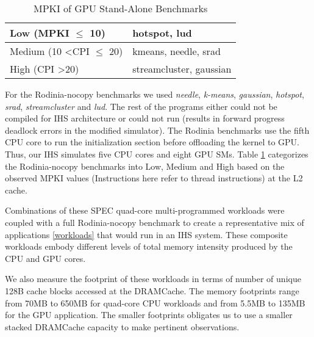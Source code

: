 \begin{table}[htb]
	\centering
	\begin{tabular}{|l|l|}
		\hline
		Low (MPKI $\leq$ 10)                & hotspot, lud           \\ \hline
		Medium (10 \textless CPI $\leq$ 20) &  kmeans, needle, srad   \\ \hline
		High (CPI \textgreater 20)            & streamcluster, gaussian       \\ \hline
	\end{tabular}
	\caption{MPKI of GPU Stand-Alone Benchmarks}
	\label{single-gpu-mpki}
\end{table}

For the Rodinia-nocopy benchmarks we used \textit{needle}, \textit{k-means}, \textit{gaussian}, \textit{hotspot}, \textit{srad}, \textit{streamcluster} and \textit{lud}. The rest of the programs either could not be compiled for IHS architecture or could not run (results in forward progress deadlock errors in the modified simulator). The Rodinia benchmarks use the fifth CPU core to run the initialization section before offloading the kernel to GPU. Thus, our IHS simulates five CPU cores and eight GPU SMs. Table \ref{single-gpu-mpki} categorizes the Rodinia-nocopy benchmarks into Low, Medium and High based on the observed MPKI values (Instructions here refer to thread instructions) at the L2 cache.


\par Combinations of these SPEC quad-core multi-programmed workloads were coupled with a full Rodinia-nocopy benchmark to create a representative mix of applications \ref{workloads} that would run in an IHS system. These composite workloads embody different levels of total memory intensity produced by the CPU and GPU cores.
\par We also measure the footprint of these workloads in terms of number of unique 128B cache blocks accessed at the DRAMCache. The memory footprints range from 70MB to 650MB for quad-core CPU workloads and from 5.5MB to 135MB for the GPU application. The smaller footprints obligates us to use a smaller stacked DRAMCache capacity to make pertinent observations.

